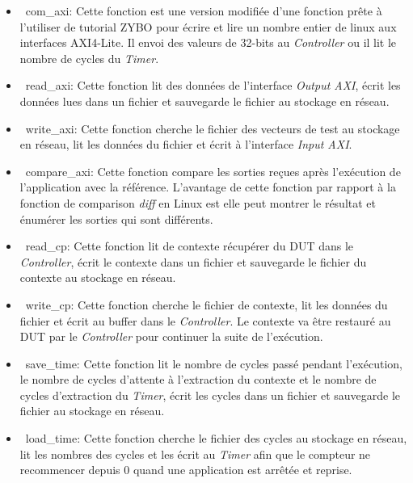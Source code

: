 \begin{itemize}
	\item\ com\_axi:
	Cette fonction est une version modifiée d'une fonction prête à l'utiliser de tutorial ZYBO pour écrire et lire un nombre entier
	de linux aux interfaces AXI4-Lite. Il envoi des valeurs de 32-bits au \emph{Controller} ou il lit le nombre de cycles du \emph{Timer}.

	\item\ read\_axi:
	Cette fonction lit des données de l'interface \emph{Output AXI}, écrit les données lues dans un fichier et sauvegarde le fichier au stockage en réseau.
	
	\item\ write\_axi:
	Cette fonction cherche le fichier des vecteurs de test au stockage en réseau, lit les données du fichier et écrit à l'interface \emph{Input AXI}.

	\item\ compare\_axi:
	Cette fonction compare les sorties reçues après l'exécution de l'application avec la référence.
	L'avantage de cette fonction par rapport à la fonction de comparison \emph{diff} en Linux est 
	elle peut montrer le résultat et énumérer les sorties qui sont différents.

	\item\ read\_cp:
	Cette fonction lit de contexte récupérer du DUT dans le \emph{Controller}, écrit le contexte dans un fichier
	et sauvegarde le fichier du contexte au stockage en réseau.
	
	\item\ write\_cp:
	Cette fonction cherche le fichier de contexte, lit les données du fichier et écrit au buffer dans le \emph{Controller}.
	Le contexte va être restauré au DUT par le \emph{Controller} pour continuer la suite de l'exécution.
	
	\item\ save\_time:
	Cette fonction lit le nombre de cycles passé pendant l'exécution, le nombre de cycles d'attente à
	l'extraction du contexte et le nombre de cycles d'extraction du \emph{Timer}, écrit les cycles dans un fichier
	et sauvegarde le fichier au stockage en réseau.
	
	\item\ load\_time:
	Cette fonction cherche le fichier des cycles au stockage en réseau, lit les nombres des cycles
	et les écrit au \emph{Timer} afin que le compteur ne recommencer depuis 0 quand une application
	est arrêtée et reprise.

\end{itemize}

